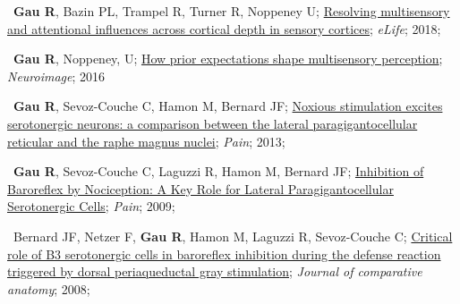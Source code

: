 \textbullet~\textbf{Gau R}, Bazin PL, Trampel R, Turner R, Noppeney U;
\href{https://osf.io/x3uak/}{Resolving multisensory and attentional influences across cortical depth in sensory cortices};
\textit{eLife};
2018;

\textbullet~\textbf{Gau R}, Noppeney, U;
\href{https://osf.io/8frkq/}{How prior expectations shape multisensory perception};
\textit{Neuroimage};
2016

\textbullet~\textbf{Gau R}, Sevoz-Couche C, Hamon M, Bernard JF;
\href{https://osf.io/ktcv9/}{Noxious stimulation excites serotonergic neurons: a comparison between the lateral paragigantocellular reticular and the raphe magnus nuclei};
\textit{Pain};
2013;

\textbullet~\textbf{Gau R}, Sevoz-Couche C, Laguzzi R, Hamon M, Bernard JF;
\href{https://osf.io/cqhvb/}{Inhibition of Baroreflex by Nociception: A Key Role for Lateral Paragigantocellular Serotonergic Cells};
\textit{Pain};
2009;
\newline
{}

\textbullet~Bernard JF, Netzer F, \textbf{Gau R}, Hamon M, Laguzzi R, Sevoz-Couche C;
\href{https://osf.io/rcvuj/}{Critical role of B3 serotonergic cells in baroreflex inhibition during the defense reaction triggered by dorsal periaqueductal gray stimulation};
\textit{Journal of comparative anatomy};
2008;
